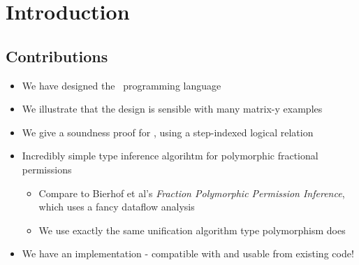 \section{Introduction}

\subsection{Contributions}
\begin{itemize}
    \item We have designed the \LANG\ programming language
    \item We illustrate that the design is sensible with many matrix-y examples
    \item We give a soundness proof for \LANG, using a step-indexed logical relation
    \item Incredibly simple type inference algorihtm for polymorphic fractional permissions
        \begin{itemize}
            \item Compare to Bierhof et al's \emph{Fraction Polymorphic Permission Inference},
                which uses a fancy dataflow analysis
            \item We use exactly the same unification algorithm type polymorphism does
        \end{itemize}
    \item We have an implementation - compatible with and usable from existing code!
\end{itemize}

